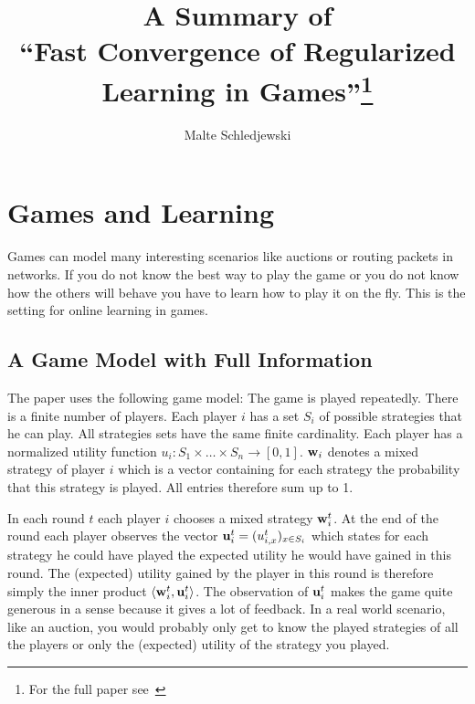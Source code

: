 \documentclass[a4paper]{article}
\title{A Summary of \\ \enquote{Fast Convergence of Regularized
    Learning in Games}\footnote{For the full paper see~\cite[]{2015arXiv150700407S}}}
\author{Malte Schledjewski}
\theoremstyle{definition}
\newcommand{\mst}{\ensuremath{w}}
\renewcommand{\vec}[1]{\ensuremath{{\bf #1}}}
\newcommand{\dotp}[2]{\ensuremath{\left\langle #1, #2 \right\rangle}}
\begin{document}

\setlength{\parskip}{0pt plus0pt minus3pt}



\maketitle

\section{Games and Learning}

Games can model many interesting scenarios like auctions or routing
packets in networks.
If you do not know the best way to play the game or you do not know
how the others will behave you have to learn how to play it
on the fly.
This is the setting for online learning in games.




\subsection{A Game Model with Full Information}
The paper uses the following game model:
The game is played repeatedly.
There is a finite number of players.
Each player $i$ has a set $S_i$ of possible strategies that he can play.
All strategies sets have the same finite cardinality.
Each player has a normalized utility function
$u_i: S_1\times \ldots \times S_n \rightarrow [0,1]$.
 $\vec{w}_i$ denotes a mixed strategy of player $i$ which is a
 vector containing for each strategy the probability that this
 strategy is played. All entries therefore sum up to 1. 

In each round $t$ each player $i$ chooses a mixed strategy $\vec{\mst}_i^t$.
At the end of the round each player observes the vector $\vec{u}_i^t =
(u_{i,x}^t)_{x\in S_i}$
which states for each strategy he could have played the expected
utility he would have gained in this round.
The (expected) utility gained by the player in this round is therefore simply the
inner product $\dotp{ \vec{\mst}_i^t}{\vec{u}_i^t}$.
The observation of $\vec{u}_i^t$ makes the game quite generous in a sense because it gives a lot
of feedback. In a real world scenario, like an auction, you would
probably only get to know the played strategies of all the players or
only the (expected) utility of the strategy you played.
\end{document}
